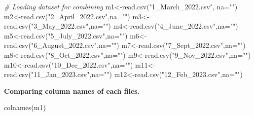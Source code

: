 \documentclass[
]{article}
\newenvironment{Shaded}{\begin{snugshade}}{\end{snugshade}}
\newcommand{\AttributeTok}[1]{\textcolor[rgb]{0.77,0.63,0.00}{#1}}
\newcommand{\CommentTok}[1]{\textcolor[rgb]{0.56,0.35,0.01}{\textit{#1}}}
\newcommand{\FunctionTok}[1]{\textcolor[rgb]{0.00,0.00,0.00}{#1}}
\newcommand{\NormalTok}[1]{#1}
\newcommand{\OtherTok}[1]{\textcolor[rgb]{0.56,0.35,0.01}{#1}}
\newcommand{\StringTok}[1]{\textcolor[rgb]{0.31,0.60,0.02}{#1}}
\begin{document}
\begin{Shaded}
\begin{Highlighting}[]
\CommentTok{\# Loading dataset for combining}
\NormalTok{m1}\OtherTok{\textless{}{-}}\FunctionTok{read.csv}\NormalTok{(}\StringTok{"1\_March\_2022.csv"}\NormalTok{, }\AttributeTok{na=}\StringTok{""}\NormalTok{)}
\NormalTok{m2}\OtherTok{\textless{}{-}}\FunctionTok{read.csv}\NormalTok{(}\StringTok{"2\_April\_2022.csv"}\NormalTok{,}\AttributeTok{na=}\StringTok{""}\NormalTok{)}
\NormalTok{m3}\OtherTok{\textless{}{-}}\FunctionTok{read.csv}\NormalTok{(}\StringTok{"3\_May\_2022.csv"}\NormalTok{,}\AttributeTok{na=}\StringTok{""}\NormalTok{)}
\NormalTok{m4}\OtherTok{\textless{}{-}}\FunctionTok{read.csv}\NormalTok{(}\StringTok{"4\_June\_2022.csv"}\NormalTok{,}\AttributeTok{na=}\StringTok{""}\NormalTok{)}
\NormalTok{m5}\OtherTok{\textless{}{-}}\FunctionTok{read.csv}\NormalTok{(}\StringTok{"5\_July\_2022.csv"}\NormalTok{,}\AttributeTok{na=}\StringTok{""}\NormalTok{)}
\NormalTok{m6}\OtherTok{\textless{}{-}}\FunctionTok{read.csv}\NormalTok{(}\StringTok{"6\_August\_2022.csv"}\NormalTok{,}\AttributeTok{na=}\StringTok{""}\NormalTok{)}
\NormalTok{m7}\OtherTok{\textless{}{-}}\FunctionTok{read.csv}\NormalTok{(}\StringTok{"7\_Sept\_2022.csv"}\NormalTok{,}\AttributeTok{na=}\StringTok{""}\NormalTok{)}
\NormalTok{m8}\OtherTok{\textless{}{-}}\FunctionTok{read.csv}\NormalTok{(}\StringTok{"8\_Oct\_2022.csv"}\NormalTok{,}\AttributeTok{na=}\StringTok{""}\NormalTok{)}
\NormalTok{m9}\OtherTok{\textless{}{-}}\FunctionTok{read.csv}\NormalTok{(}\StringTok{"9\_Nov\_2022.csv"}\NormalTok{,}\AttributeTok{na=}\StringTok{""}\NormalTok{)}
\NormalTok{m10}\OtherTok{\textless{}{-}}\FunctionTok{read.csv}\NormalTok{(}\StringTok{"10\_Dec\_2022.csv"}\NormalTok{,}\AttributeTok{na=}\StringTok{""}\NormalTok{)}
\NormalTok{m11}\OtherTok{\textless{}{-}}\FunctionTok{read.csv}\NormalTok{(}\StringTok{"11\_Jan\_2023.csv"}\NormalTok{,}\AttributeTok{na=}\StringTok{""}\NormalTok{)}
\NormalTok{m12}\OtherTok{\textless{}{-}}\FunctionTok{read.csv}\NormalTok{(}\StringTok{"12\_Feb\_2023.csv"}\NormalTok{,}\AttributeTok{na=}\StringTok{""}\NormalTok{)}
\end{Highlighting}
\end{Shaded}

\textbf{Comparing column names of each files.}

\begin{Shaded}
\begin{Highlighting}[]
\FunctionTok{colnames}\NormalTok{(m1)}
\end{Highlighting}
\end{Shaded}
\end{document}
